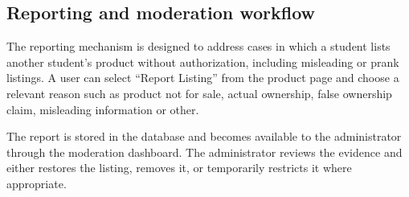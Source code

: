 \documentclass[11pt,a4paper]{article}
\begin{document}

\subsection{Reporting and moderation workflow}

The reporting mechanism is designed to address cases in which a
student lists another student's product without authorization,
including misleading or prank listings. A user can select
``Report Listing'' from the product page and choose a relevant
reason such as product not for sale, actual ownership, false
ownership claim, misleading information or other.

The report is stored in the database and becomes available to the
administrator through the moderation dashboard. The administrator
reviews the evidence and either restores the listing, removes it,
or temporarily restricts it where appropriate.

\end{document}
